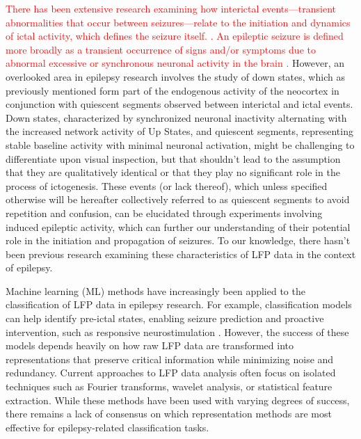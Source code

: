 \documentclass{article}
\begin{document}
\textcolor{red}{There has been extensive research examining how interictal events—transient abnormalities that occur between seizures—relate to the initiation and dynamics of ictal activity, which defines the seizure itself. \cite{karoly2016}. An epileptic seizure is defined more broadly as a transient occurrence of signs and/or symptoms due to abnormal excessive or synchronous neuronal activity in the brain \cite{falco2018}.} However, an overlooked area in epilepsy research involves the study of down states, which as previously mentioned form part of the endogenous activity of the neocortex \cite{kajikawa2022} in conjunction with quiescent segments observed between interictal and ictal events. Down states, characterized by synchronized neuronal inactivity alternating with the increased network activity of Up States, and quiescent segments, representing stable baseline activity with minimal neuronal activation, might be challenging to differentiate upon visual inspection, but that shouldn’t lead to the assumption that they are qualitatively identical or that they play no significant role in the process of ictogenesis. These events (or lack thereof), which unless specified otherwise will be hereafter collectively referred to as quiescent segments to avoid repetition and confusion, can be elucidated through experiments involving induced epileptic activity, which can further our understanding of their potential role in the initiation and propagation of seizures. To our knowledge, there hasn’t been previous research examining these characteristics of LFP data in the context of epilepsy.

Machine learning (ML) methods have increasingly been applied to the classification of LFP data in epilepsy research. For example, classification models can help identify pre-ictal states, enabling seizure prediction and proactive intervention, such as responsive neurostimulation \cite{gadhoumi2016}. However, the success of these models depends heavily on how raw LFP data are transformed into representations that preserve critical information while minimizing noise and redundancy. Current approaches to LFP data analysis often focus on isolated techniques such as Fourier transforms, wavelet analysis, or statistical feature extraction. While these methods have been used with varying degrees of success, there remains a lack of consensus on which representation methods are most effective for epilepsy-related classification tasks.
\end{document}
